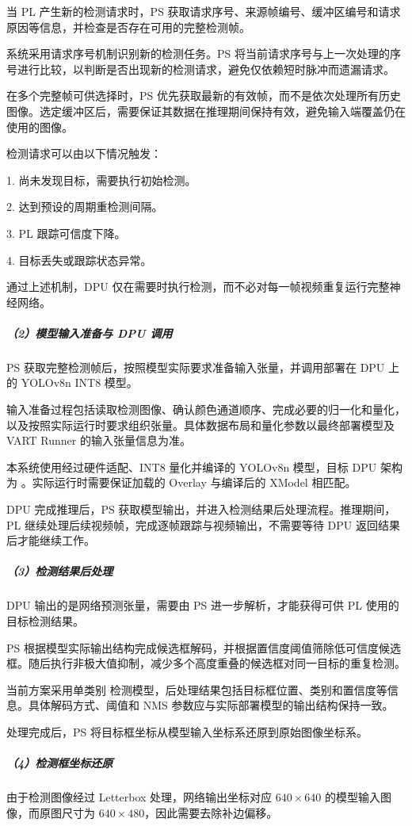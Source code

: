 \documentclass[UTF8,a4paper,12pt,fontset=windows]{ctexart}
\begin{document}
当 PL 产生新的检测请求时，PS 获取请求序号、来源帧编号、缓冲区编号和请求原因等信息，并检查是否存在可用的完整检测帧。

系统采用请求序号机制识别新的检测任务。PS 将当前请求序号与上一次处理的序号进行比较，以判断是否出现新的检测请求，避免仅依赖短时脉冲而遗漏请求。

在多个完整帧可供选择时，PS 优先获取最新的有效帧，而不是依次处理所有历史图像。选定缓冲区后，需要保证其数据在推理期间保持有效，避免输入端覆盖仍在使用的图像。

检测请求可以由以下情况触发：

1. 尚未发现目标，需要执行初始检测。

2. 达到预设的周期重检测间隔。

3. PL 跟踪可信度下降。

4. 目标丢失或跟踪状态异常。

通过上述机制，DPU 仅在需要时执行检测，而不必对每一帧视频重复运行完整神经网络。

\subparagraph*{（2）模型输入准备与 DPU 调用}
PS 获取完整检测帧后，按照模型实际要求准备输入张量，并调用部署在 DPU 上的 YOLOv8n INT8 模型。

输入准备过程包括读取检测图像、确认颜色通道顺序、完成必要的归一化和量化，以及按照实际运行时要求组织张量。具体数据布局和量化参数以最终部署模型及 VART Runner 的输入张量信息为准。

本系统使用经过硬件适配、INT8 量化并编译的 YOLOv8n 模型，目标 DPU 架构为 。实际运行时需要保证加载的 Overlay 与编译后的 XModel 相匹配。

DPU 完成推理后，PS 获取模型输出，并进入检测结果后处理流程。推理期间，PL 继续处理后续视频帧，完成逐帧跟踪与视频输出，不需要等待 DPU 返回结果后才能继续工作。

\subparagraph*{（3）检测结果后处理}
DPU 输出的是网络预测张量，需要由 PS 进一步解析，才能获得可供 PL 使用的目标检测结果。

PS 根据模型实际输出结构完成候选框解码，并根据置信度阈值筛除低可信度候选框。随后执行非极大值抑制，减少多个高度重叠的候选框对同一目标的重复检测。

当前方案采用单类别  检测模型，后处理结果包括目标框位置、类别和置信度等信息。具体解码方式、阈值和 NMS 参数应与实际部署模型的输出结构保持一致。

处理完成后，PS 将目标框坐标从模型输入坐标系还原到原始图像坐标系。

\subparagraph*{（4）检测框坐标还原}
由于检测图像经过 Letterbox 处理，网络输出坐标对应 \(640\times640\) 的模型输入图像，而原图尺寸为 \(640\times480\)，因此需要去除补边偏移。
\end{document}
